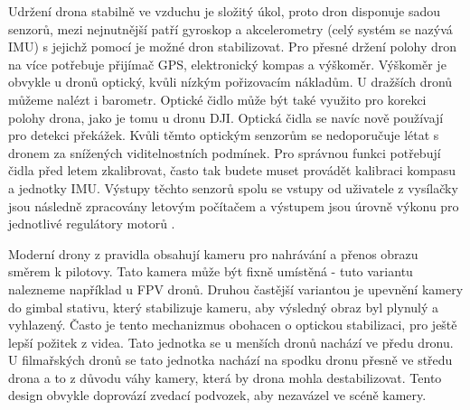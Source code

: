 Udržení drona stabilně ve vzduchu je složitý úkol, proto dron disponuje sadou senzorů, mezi nejnutnější patří gyroskop a akcelerometry (celý systém se nazývá IMU) s jejichž pomocí je možné dron stabilizovat. Pro přesné držení polohy dron na více potřebuje přijímač GPS, elektronický kompas a výškoměr. Výškoměr je obvykle u dronů optický, kvůli nízkým pořizovacím nákladům. U dražších dronů můžeme nalézt i barometr. Optické čidlo může být také využito pro korekci polohy drona, jako je tomu u dronu DJI. Optická čidla se navíc nově používají pro detekci překážek. Kvůli těmto optickým senzorům se nedoporučuje létat s dronem za snížených viditelnostních podmínek. Pro správnou funkci potřebují čidla před letem zkalibrovat, často tak budete muset provádět kalibraci kompasu a jednotky IMU. Výstupy těchto senzorů spolu se vstupy od uživatele z vysílačky jsou následně zpracovány letovým počítačem a výstupem jsou úrovně výkonu pro jednotlivé regulátory motorů \cite{droneSenzors}.

Moderní drony z pravidla obsahují kameru pro nahrávání a přenos obrazu směrem k pilotovy. Tato kamera může být fixně umístěná - tuto variantu nalezneme například u FPV dronů. Druhou častější variantou je upevnění kamery do gimbal stativu, který stabilizuje kameru, aby výsledný obraz byl plynulý a vyhlazený. Často je tento mechanizmus obohacen o optickou stabilizaci, pro ještě lepší požitek z videa. Tato jednotka se u menších dronů nachází ve předu dronu. U filmařských dronů se tato jednotka nachází na spodku dronu přesně ve středu drona a to z důvodu váhy kamery, která by drona mohla destabilizovat. Tento design obvykle doprovází zvedací podvozek, aby nezavázel ve scéně kamery.


